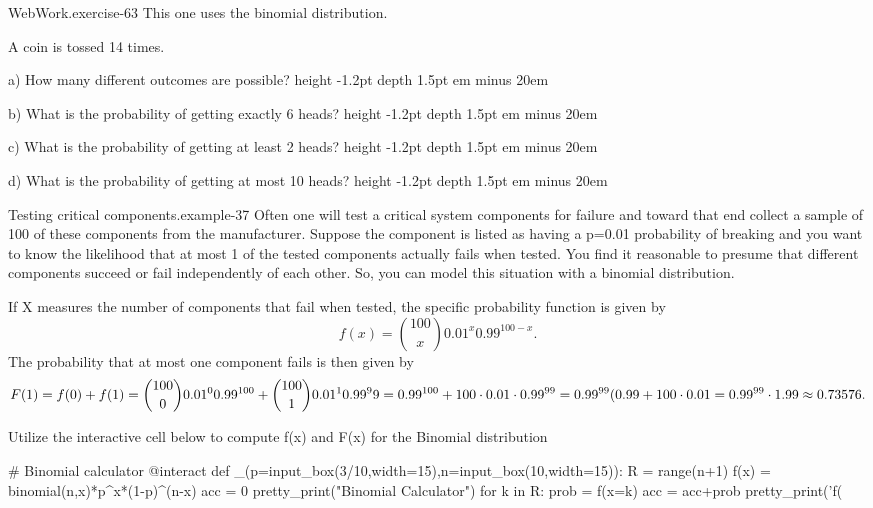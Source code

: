 \documentclass[10pt,]{book}
\newcommand{\fillin}[1]{\leavevmode\leaders\vrule height -1.2pt depth 1.5pt \hskip #1em minus #1em \null}
\numberwithin{equation}{section}
\begin{document}
\hypertarget{p-899}{}%
\begin{inlineexercise}{WebWork.}{exercise-63}%
\hypertarget{p-900}{}%
This one uses the binomial distribution.%
\par\medskip
\hypertarget{p-901}{}%
A coin is tossed 14 times.%
\par
\hypertarget{p-902}{}%
a) How many different outcomes are possible?   \fillin{20}%
\par
\hypertarget{p-903}{}%
b) What is the probability of getting exactly 6 heads?  \fillin{20}%
\par
\hypertarget{p-904}{}%
c) What is the probability of getting at least 2 heads?  \fillin{20}%
\par
\hypertarget{p-905}{}%
d) What is the probability of getting at most 10 heads?  \fillin{20}%
\end{inlineexercise}
%
\begin{example}{Testing critical components.}{example-37}%
\hypertarget{p-906}{}%
Often one will test a critical system components for failure and toward that end collect a sample of 100 of these components from the manufacturer. Suppose the component is listed as having a p=0.01 probability of breaking and you want to know the likelihood that at most 1 of the tested components actually fails when tested. You find it reasonable to presume that different components succeed or fail independently of each other. So, you can model this situation with a binomial distribution.%
\par
\hypertarget{p-907}{}%
If X measures the number of components that fail when tested, the specific probability function is given by%
\begin{equation*}
f(x) = \binom{100}{x} 0.01^x 0.99^{100-x}.
\end{equation*}
The probability that at most one component fails is then given by%
\begin{equation*}
F(1) = f(0) + f(1) = \binom{100}{0} 0.01^0 0.99^{100} + \binom{100}{1} 0.01^1 0.99^99 \\ = 0.99^{100} + 100 \cdot 0.01 \cdot 0.99^{99} = 0.99^{99}(0.99 + 100 \cdot 0.01 \\ = 0.99^{99} \cdot 1.99 \approx 0.73576.
\end{equation*}
%
\end{example}
\hypertarget{p-908}{}%
Utilize the interactive cell below to compute f(x) and F(x) for the Binomial distribution%
\par
\hypertarget{p-909}{}%
\leavevmode%
\begin{sageinput}
# Binomial calculator
@interact
def _(p=input_box(3/10,width=15),n=input_box(10,width=15)):
    R = range(n+1)
    f(x) = binomial(n,x)*p^x*(1-p)^(n-x)
    acc = 0
    pretty_print("Binomial Calculator")
    for k in R:
        prob = f(x=k)
        acc = acc+prob
        pretty_print('f(%
\end{sageinput}
\end{document}
